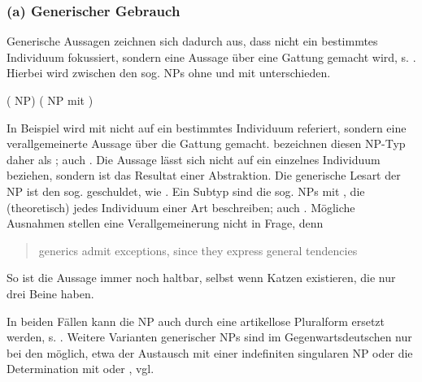 \subsubsection{(a) Generischer Gebrauch}\label{sec-generisch}

Generische Aussagen zeichnen sich dadurch aus, dass nicht ein bestimmtes Individuum fokussiert, sondern eine Aussage über eine Gattung gemacht wird, s.  \parencite[übersetzt und gekürzt aus][]{Krifka1995}. Hierbei wird zwischen den sog.  NPs ohne und mit  unterschieden.   

\begin{exe}
	\ex \label{ex:gener}   
	\begin{xlist}
		\ex \label{ex:sued} ( NP)
		\ex \label{ex:vitc}  ( NP mit )
		\end{xlist}
\end{exe}

In Beispiel  wird mit  nicht auf ein bestimmtes Individuum referiert, sondern eine verallgemeinerte Aussage über die Gattung  gemacht. \textcite[2]{Krifka1995} bezeichnen diesen NP-Typ daher als ; auch  \parencite[138]{Bisle-Muller1991}. Die Aussage lässt sich nicht auf ein einzelnes Individuum beziehen, sondern ist das Resultat einer Abstraktion. Die generische Lesart der NP ist den sog.  geschuldet, wie  \parencite{Krifka1995}. Ein Subtyp sind die sog.  NPs mit , die (theoretisch) jedes Individuum einer Art beschreiben; auch   \parencite[139f.]{Bisle-Muller1991}. Mögliche Ausnahmen stellen eine Verallgemeinerung nicht in Frage, denn  \blockcquote[179]{Lyons1999}{generics admit exceptions, since they express general tendencies}. So ist die Aussage   immer noch haltbar, selbst wenn Katzen existieren, die nur drei Beine haben.

In beiden Fällen kann die NP auch durch eine artikellose Pluralform ersetzt werden, s. . 
Weitere Varianten generischer NPs sind im Gegenwartsdeutschen nur bei den  möglich, etwa der Austausch mit einer indefiniten singularen NP oder die Determination mit  oder  \parencite[296]{Duden2009}, vgl.  

